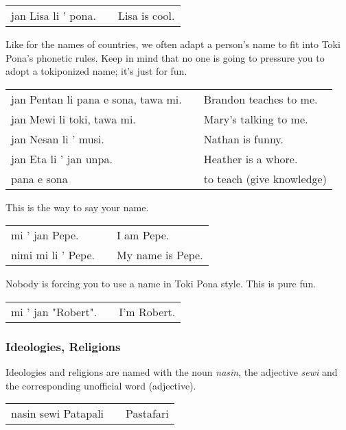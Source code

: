 \begin{supertabular}{p{5,5cm}|ll}
    jan Lisa li ' pona. &  & Lisa is cool. \\
\end{supertabular}

Like for the names of countries, we often adapt a person's name to fit into Toki Pona's phonetic rules.
Keep in mind that no one is going to pressure you to adopt a tokiponized name; it's just for fun.

\begin{supertabular}{p{5,5cm}|ll}
    jan Pentan li pana e sona, tawa mi. &  & Brandon teaches to me.    \\
    jan Mewi li toki, tawa mi.          &  & Mary's talking to me.     \\
    jan Nesan li ' musi.                &  & Nathan is funny.          \\
    jan Eta li ' jan unpa.              &  & Heather is a whore.       \\
    pana e sona                         &  & to teach (give knowledge) \\
\end{supertabular}

This is the way to say your name.

\begin{supertabular}{p{5,5cm}|ll}
    mi ' jan Pepe.     &  & I am Pepe.       \\
    nimi mi li ' Pepe. &  & My name is Pepe. \\
\end{supertabular}

Nobody is forcing you to use a name in Toki Pona style.
This is pure fun.

\begin{supertabular}{p{5,5cm}|ll}
    mi ' jan "Robert". &  & I'm Robert. \\
\end{supertabular}

\subsubsection*{Ideologies, Religions}
Ideologies and religions are named with the noun \textit{nasin}, the adjective \textit{sewi} and the corresponding unofficial word (adjective).

\begin{supertabular}{p{5,5cm}|ll}
    nasin sewi Patapali &  & Pastafari \\
\end{supertabular}

